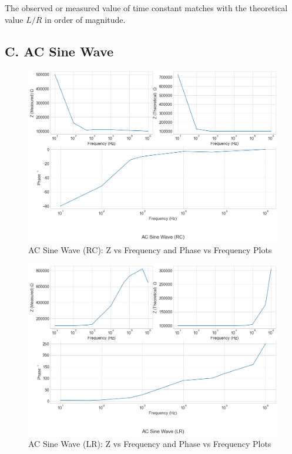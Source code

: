 \documentclass[a4paper,12pt]{article}
\begin{document}
The observed or measured value of time constant matches with the theoretical value $L/R$ in order of magnitude. 

\subsection*{C. AC Sine Wave}

\begin{figure}[H]
  \centering
  \includegraphics[width=0.8\linewidth]{../code/AC Sine Wave (RC).png}    
  \caption{AC Sine Wave (RC): Z vs Frequency and Phase vs Frequency Plots}
  \label{Combined_RC_AC}
\end{figure}

\begin{figure}[H]
  \centering
  \includegraphics[width=0.8\linewidth]{../code/AC Sine Wave (LR).png}    
    \caption{AC Sine Wave (LR): Z vs Frequency and Phase vs Frequency Plots}
    \label{Combined_LR_AC}
\end{figure}
\end{document}
